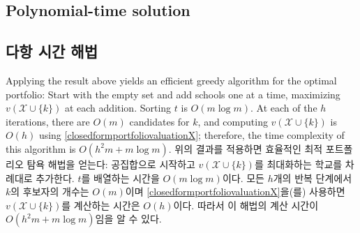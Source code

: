 \documentclass[11pt]{article} %
\DeclareMathOperator*{\argmax}{arg\,max}
\newtheorem{theorem}{Theorem}
\theoremstyle{definition}
\newtheorem{theorem}{정리}
\theoremstyle{definition}
\begin{document}
\ifen \subsection{Polynomial-time solution} \else \subsection{다항 시간 해법}\fi
\ifen Applying the result above yields an efficient greedy algorithm for the optimal portfolio: Start with the empty set and add schools one at a time, maximizing $v(\mathcal{X}\cup \{k\})$ at each addition. Sorting $t$ is  $O(m \log m)$.  At each of the $h$ iterations, there are $O(m)$ candidates for $k$, and computing $v(\mathcal{X}\cup \{k\})$ is $O(h)$ using \eqref{closedformportfoliovaluationX}; therefore, the time complexity of this algorithm is $O(h^2 m + m \log m)$. 
\else 위의 결과를 적용하면 효율적인 최적 포트폴리오 탐욕 해법을 얻는다: 공집합으로 시작하고 $v(\mathcal{X}\cup \{k\})$를 최대화하는 학교를 차례대로 추가한다. $t$를 배열하는 시간을 $O(m \log m)$이다. 모든 $h$개의 반복 단계에서 $k$의 후보자의 개수는 $O(m)$이며 \eqref{closedformportfoliovaluationX}을(를) 사용하면 $v(\mathcal{X}\cup \{k\})$를 계산하는 시간은 $O(h)$이다. 따라서 이 해법의 계산 시간이 $O(h^2 m + m \log m)$임을 알 수 있다.\fi
%
\end{document}
